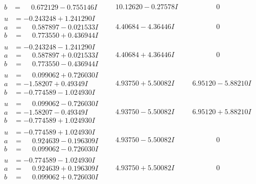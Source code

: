 \documentclass[1p]{elsarticle_modified}
\theoremstyle{definition}
\begin{document}
$$\begin{array}{c|c|c}
\begin{aligned}
b &= \phantom{-}0.672129 - 0.755146 I\end{aligned}
 & \phantom{-}10.12620 - 0.27578 I & \phantom{-0.000000 } 0 \\ \hline\begin{aligned}
u &= -0.243248 + 1.241290 I \\
a &= \phantom{-}0.587897 - 0.021533 I \\
b &= \phantom{-}0.773550 + 0.436944 I\end{aligned}
 & \phantom{-}4.40684 - 4.36446 I & \phantom{-0.000000 } 0 \\ \hline\begin{aligned}
u &= -0.243248 - 1.241290 I \\
a &= \phantom{-}0.587897 + 0.021533 I \\
b &= \phantom{-}0.773550 - 0.436944 I\end{aligned}
 & \phantom{-}4.40684 + 4.36446 I & \phantom{-0.000000 } 0 \\ \hline\begin{aligned}
u &= \phantom{-}0.099062 + 0.726030 I \\
a &= -1.58207 + 0.49349 I \\
b &= -0.774589 - 1.024930 I\end{aligned}
 & \phantom{-}4.93750 + 5.50082 I & \phantom{-}6.95120 - 5.88210 I \\ \hline\begin{aligned}
u &= \phantom{-}0.099062 - 0.726030 I \\
a &= -1.58207 - 0.49349 I \\
b &= -0.774589 + 1.024930 I\end{aligned}
 & \phantom{-}4.93750 - 5.50082 I & \phantom{-}6.95120 + 5.88210 I \\ \hline\begin{aligned}
u &= -0.774589 + 1.024930 I \\
a &= \phantom{-}0.924639 - 0.196309 I \\
b &= \phantom{-}0.099062 - 0.726030 I\end{aligned}
 & \phantom{-}4.93750 - 5.50082 I & \phantom{-0.000000 } 0 \\ \hline\begin{aligned}
u &= -0.774589 - 1.024930 I \\
a &= \phantom{-}0.924639 + 0.196309 I \\
b &= \phantom{-}0.099062 + 0.726030 I\end{aligned}
 & \phantom{-}4.93750 + 5.50082 I & \phantom{-0.000000 } 0 \\ \hline\begin{aligned}

\end{aligned}
\end{array}$$
\end{document}
